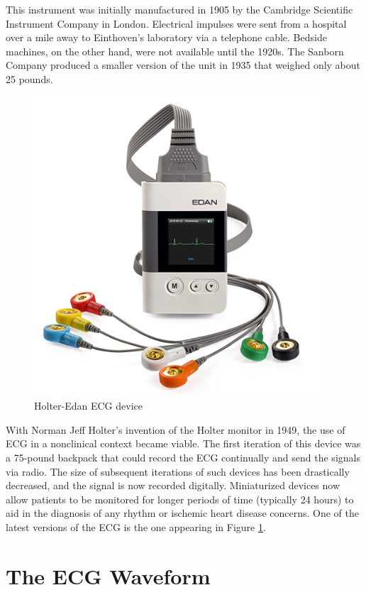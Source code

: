 This instrument was initially manufactured in 1905 by the Cambridge Scientific Instrument Company in London. Electrical impulses were sent from a hospital over a mile away to Einthoven's laboratory via a telephone cable. Bedside machines, on the other hand, were not available until the 1920s. The Sanborn Company produced a smaller version of the unit in 1935 that weighed only about 25 pounds.

\begin{figure}[H]
\centering
\includegraphics[scale=0.7]{img/holter_edan_ecg.PNG}
\caption{Holter-Edan ECG device}
\label{fig:holter_monitor}
\end{figure}

With Norman Jeff Holter's invention of the Holter monitor in 1949, the use of ECG in a nonclinical context became viable. The first iteration of this device was a 75-pound backpack that could record the ECG continually and send the signals via radio. The size of subsequent iterations of such devices has been drastically decreased, and the signal is now recorded digitally. Miniaturized devices now allow patients to be monitored for longer periods of time (typically 24 hours) to aid in the diagnosis of any rhythm or ischemic heart disease concerns. One of the latest versions of the ECG is the one appearing in Figure \ref{fig:holter_monitor}.

\section{The ECG Waveform} \label{ecg_waveform}

